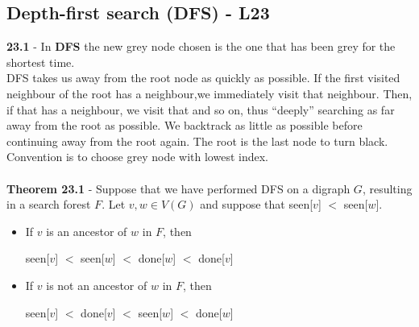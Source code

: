 \documentclass[a4paper]{article}
\begin{document}
\subsection*{Depth-first search (DFS) - L23}
\textbf{23.1} - In \textbf{DFS} the new grey node chosen is the one
that has been grey for the shortest time. \\
DFS takes us away from the root node as quickly as possible. If the first visited
neighbour of the root has a neighbour,we immediately visit that neighbour. Then,
if that has a neighbour, we visit that and so on, thus “deeply” searching as far away
from the root as possible. We backtrack as little as possible before continuing
away from the root again. The root is the last node to turn black. Convention is to choose
grey node with lowest index.\\\\
\textbf{Theorem 23.1} - Suppose that we have performed DFS on a digraph $G$, resulting in
a search forest $F$. Let $v, w \in V(G)$ and suppose that seen[$v$] $<$ seen[$w$].
\begin{itemize}
    \item If $v$ is an ancestor of $w$ in $F$, then
    \begin{center}
        seen[$v$] $<$ seen[$w$] $<$ done[$w$] $<$ done[$v$]        
    \end{center}
    \item If $v$ is not an ancestor of $w$ in $F$, then
    \begin{center}
        seen[$v$] $<$ done[$v$] $<$ seen[$w$] $<$ done[$w$]            
    \end{center}
\end{itemize}
\end{document}
